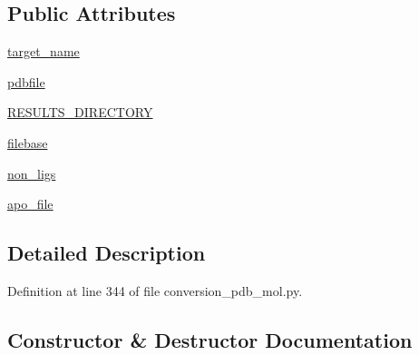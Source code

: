 \subsection*{Public Attributes}
\begin{DoxyCompactItemize}
\item 
\hyperlink{classfragalysis__api_1_1xcimporter_1_1conversion__pdb__mol_1_1pdb__apo_a334c98d4dfa204c7673f2f0bffdc60e1}{target\+\_\+name}
\item 
\hyperlink{classfragalysis__api_1_1xcimporter_1_1conversion__pdb__mol_1_1pdb__apo_a3c88c5322210bd36204fef2310fb80ce}{pdbfile}
\item 
\hyperlink{classfragalysis__api_1_1xcimporter_1_1conversion__pdb__mol_1_1pdb__apo_a110bfcd93d73bebd25ec64b258bd5b6a}{R\+E\+S\+U\+L\+T\+S\+\_\+\+D\+I\+R\+E\+C\+T\+O\+RY}
\item 
\hyperlink{classfragalysis__api_1_1xcimporter_1_1conversion__pdb__mol_1_1pdb__apo_a120a453eb2a3608650eda92ee0dc9ef9}{filebase}
\item 
\hyperlink{classfragalysis__api_1_1xcimporter_1_1conversion__pdb__mol_1_1pdb__apo_a53ed76d729f8d926151385334f611545}{non\+\_\+ligs}
\item 
\hyperlink{classfragalysis__api_1_1xcimporter_1_1conversion__pdb__mol_1_1pdb__apo_a9e655f451df734d5f78e8a41b8c47f89}{apo\+\_\+file}
\end{DoxyCompactItemize}


\subsection{Detailed Description}


Definition at line 344 of file conversion\+\_\+pdb\+\_\+mol.\+py.



\subsection{Constructor \& Destructor Documentation}
\mbox{\label{classfragalysis__api_1_1xcimporter_1_1conversion__pdb__mol_1_1pdb__apo_a4653e7fd666b7fd8e5bc4fe230e5e424}} 
